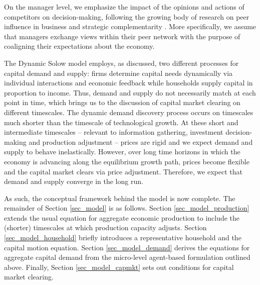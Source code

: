 \documentclass[authoryear, review]{elsarticle}
\begin{document}
On the manager level, we emphasize the impact of the opinions and actions of competitors on decision-making, following the growing body of research on peer influence in business \citep{GriskeviciusEtAl2008} and strategic complementarity \citep{CooperJohn1988, BeaudryEtAl2020}. More specifically, we assume that managers exchange views within their peer network with the purpose of coaligning their expectations about the economy. 

The Dynamic Solow model employs, as discussed, two different processes for capital demand and supply: firms determine capital needs dynamically via individual interactions and economic feedback while households supply capital in proportion to income. Thus, demand and supply do not necessarily match at each point in time, which brings us to the discussion of capital market clearing on different timescales. The dynamic demand discovery process occurs on timescales much shorter than the timescale of technological growth. At these short and intermediate timescales -- relevant to information gathering, investment decision-making and production adjustment -- prices are rigid and we expect demand and supply to behave inelastically. However, over long time horizons in which the economy is advancing along the equilibrium growth path, prices become flexible and the capital market clears via price adjustment. Therefore, we expect that demand and supply converge in the long run.

As such, the conceptual framework behind the model is now complete. The remainder of Section \ref{sec_model} is as follows. Section \ref{sec_model_production} extends the usual equation for aggregate economic production to include the (shorter) timescales at which production capacity adjusts. Section \ref{sec_model_household} briefly introduces a representative household and the capital motion equation. Section \ref{sec_model_demand} derives the equations for aggregate capital demand from the micro-level agent-based formulation outlined above. Finally, Section \ref{sec_model_capmkt} sets out conditions for capital market clearing.
\end{document}

